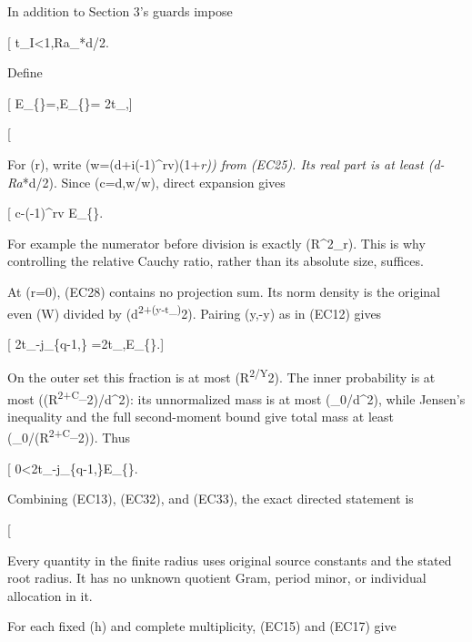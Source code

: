 In addition to Section 3's guards impose

{[} t\_I\textless1,\qquad Ra\_*\le d/2. \tag{EC30}{]}

Define

{[} E\_\{\}=,\qquad E\_\{\}= 2t\_\lambda{},{]}

{[}  \tag{EC31}{]}

For (r), write (w=(d+i(-1)\^{}rv)(1+\varepsilon\emph{r)) from (EC25). Its real part is at least (d-Ra}*\ge d/2). Since (\mathfrak c=d,w/w), direct expansion gives

{[} \left\textbar{}\mathfrak c-(-1)\^{}rv\right\textbar{} \le{} \le E\_\{\}. \tag{EC32}{]}

For example the numerator before division is exactly (R\^{}2\varepsilon\_r). This is why controlling the relative Cauchy ratio, rather than its absolute size, suffices.

At (r=0), (EC28) contains no projection sum. Its norm density is the original even (W) divided by (d\textsuperscript{2+(y-t\_\lambda)}2). Pairing (y,-y) as in (EC12) gives

{[} 2t\_\lambda-j\_\{q-1,\lambda\} =2t\_\lambda,\mathbb E\_\{\}.{]}

On the outer set this fraction is at most (R\textsuperscript{2/Y}2). The inner probability is at most (\eta(R\textsuperscript{2+C\_}2)/d\^{}2): its unnormalized mass is at most (\eta\nu\_0/d\^{}2), while Jensen's inequality and the full second-moment bound give total mass at least (\nu\_0/(R\textsuperscript{2+C\_}2)). Thus

{[} 0\textless2t\_\lambda-j\_\{q-1,\lambda\}\le E\_\{\}. \tag{EC33}{]}

Combining (EC13), (EC32), and (EC33), the exact directed statement is

{[}  \tag{EC34}{]}

Every quantity in the finite radius uses original source constants and the stated root radius. It has no unknown quotient Gram, period minor, or individual allocation in it.

For each fixed (h) and complete multiplicity, (EC15) and (EC17) give

